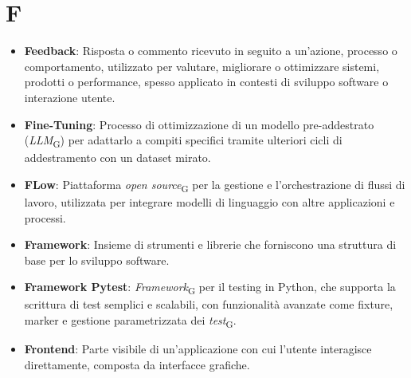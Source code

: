 \section*{F}  
\begin{itemize}
    \item \textbf{Feedback}: Risposta o commento ricevuto in seguito a un'azione, processo o comportamento, utilizzato per valutare, migliorare o ottimizzare sistemi, prodotti o performance, spesso applicato in contesti di sviluppo software o interazione utente.
    \item \textbf{Fine-Tuning}: Processo di ottimizzazione di un modello pre-addestrato (\textit{LLM}\textsubscript{G}) per adattarlo a compiti specifici tramite ulteriori cicli di addestramento con un dataset mirato.
    \item \textbf{FLow}: Piattaforma \textit{open source}\textsubscript{G} per la gestione e l'orchestrazione di flussi di lavoro, utilizzata per integrare modelli di linguaggio con altre applicazioni e processi.
    \item \textbf{Framework}: Insieme di strumenti e librerie che forniscono una struttura di base per lo sviluppo software.
    \item \textbf{Framework Pytest}:  \textit{Framework}\textsubscript{G} per il testing in Python, che supporta la scrittura di test semplici e scalabili, con funzionalità avanzate come fixture, marker e gestione parametrizzata dei \textit{test}\textsubscript{G}.
    
    \item \textbf{Frontend}: Parte visibile di un'applicazione con cui l'utente interagisce direttamente, composta da interfacce grafiche.
\end{itemize}
